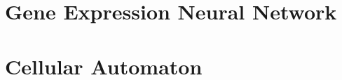 \documentclass[\main/thesis.tex]{subfiles}
\begin{document}
\section{Gene Expression Neural Network}

\section{Cellular Automaton}
\end{document}
